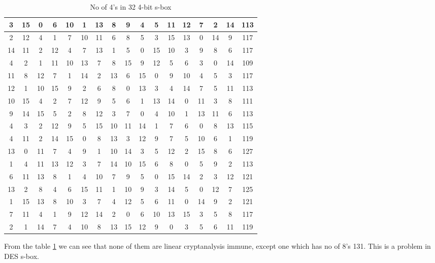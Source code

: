 \documentclass[12pt]{article}
\begin{document}
\begin{table}[H]
\begin{tabular}{|c|c|c|c|c|c|c|c|c|c|c|c|c|c|c|c|c|}
        3 & 15 & 0 & 6 & 10 & 1 & 13 & 8 & 9 & 4 & 5 & 11 & 12 & 7 & 2 & 14 & 113 \\
        \hline
        2 & 12 & 4 & 1 & 7 & 10 & 11 & 6 & 8 & 5 & 3 & 15 & 13 & 0 & 14 & 9 & 117 \\
        \hline
        14 & 11 & 2 & 12 & 4 & 7 & 13 & 1 & 5 & 0 & 15 & 10 & 3 & 9 & 8 & 6 & 117 \\
        \hline
        4 & 2 & 1 & 11 & 10 & 13 & 7 & 8 & 15 & 9 & 12 & 5 & 6 & 3 & 0 & 14 & 109 \\
        \hline
        11 & 8 & 12 & 7 & 1 & 14 & 2 & 13 & 6 & 15 & 0 & 9 & 10 & 4 & 5 & 3 & 117 \\
        \hline
        12 & 1 & 10 & 15 & 9 & 2 & 6 & 8 & 0 & 13 & 3 & 4 & 14 & 7 & 5 & 11 & 113 \\
        \hline
        10 & 15 & 4 & 2 & 7 & 12 & 9 & 5 & 6 & 1 & 13 & 14 & 0 & 11 & 3 & 8 & 111 \\
        \hline
        9 & 14 & 15 & 5 & 2 & 8 & 12 & 3 & 7 & 0 & 4 & 10 & 1 & 13 & 11 & 6 & 113 \\
        \hline
        4 & 3 & 2 & 12 & 9 & 5 & 15 & 10 & 11 & 14 & 1 & 7 & 6 & 0 & 8 & 13 & 115 \\
        \hline
        4 & 11 & 2 & 14 & 15 & 0 & 8 & 13 & 3 & 12 & 9 & 7 & 5 & 10 & 6 & 1 & 119 \\
        \hline
        13 & 0 & 11 & 7 & 4 & 9 & 1 & 10 & 14 & 3 & 5 & 12 & 2 & 15 & 8 & 6 & 127 \\
        \hline
        1 & 4 & 11 & 13 & 12 & 3 & 7 & 14 & 10 & 15 & 6 & 8 & 0 & 5 & 9 & 2 & 113 \\
        \hline
        6 & 11 & 13 & 8 & 1 & 4 & 10 & 7 & 9 & 5 & 0 & 15 & 14 & 2 & 3 & 12 & 121 \\
        \hline
        13 & 2 & 8 & 4 & 6 & 15 & 11 & 1 & 10 & 9 & 3 & 14 & 5 & 0 & 12 & 7 & 125 \\
        \hline
        1 & 15 & 13 & 8 & 10 & 3 & 7 & 4 & 12 & 5 & 6 & 11 & 0 & 14 & 9 & 2 & 121 \\
        \hline
        7 & 11 & 4 & 1 & 9 & 12 & 14 & 2 & 0 & 6 & 10 & 13 & 15 & 3 & 5 & 8 & 117 \\
        \hline
        2 & 1 & 14 & 7 & 4 & 10 & 8 & 13 & 15 & 12 & 9 & 0 & 3 & 5 & 6 & 11 & 119 \\
        \hline
    \end{tabular}
    \caption{No of 4's in 32 4-bit s-box}
    \label{sec:2}
\end{table}
From the table \ref{sec:2} we can see that none of them are linear cryptanalysis immune, except one which has no of 8's 131. This is a problem in DES s-box.
\end{document}
